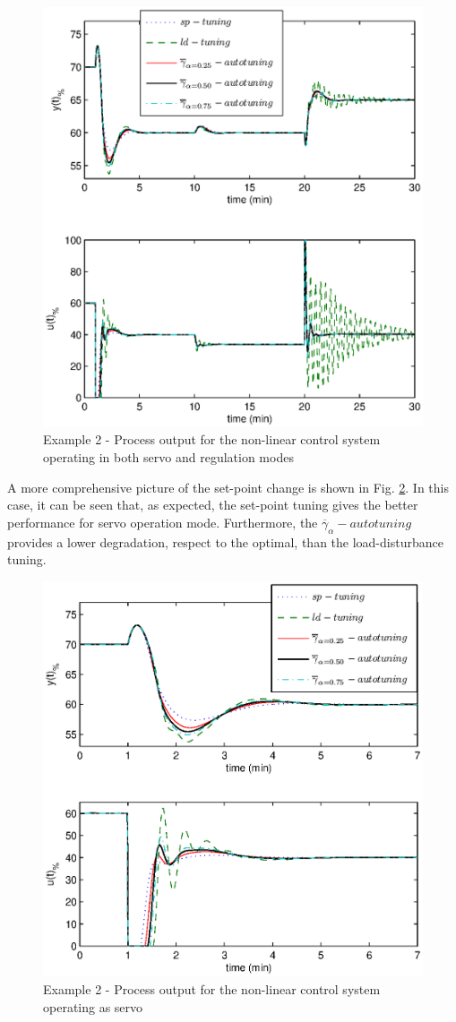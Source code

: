 \begin{figure}[htb!]
    \begin{center}
        \includegraphics[width=0.7\linewidth]{y3outp1.eps}
       \caption{Example 2 - Process output for the non-linear control system operating in both servo and regulation modes} \label{y31}
    \end{center}
\end{figure}

A more comprehensive picture of the set-point change is shown in
Fig. \ref{y32}. In this case, it can be seen that, as expected,
the set-point tuning gives the better performance for servo
operation mode. Furthermore, the
$\overline{\gamma}_{\alpha}-autotuning$ provides a lower
degradation, respect to the optimal, than the load-disturbance
tuning.

\begin{figure}[htb!]
    \begin{center}
        \includegraphics[width=0.7\linewidth]{y3outp2.eps}
       \caption{Example 2 - Process output for the non-linear control system operating as servo} \label{y32}
    \end{center}
\end{figure}

